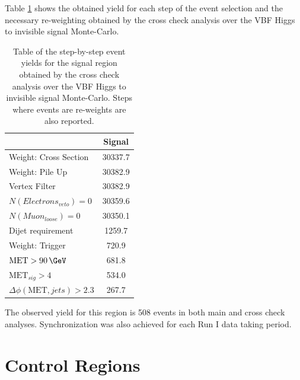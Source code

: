 Table \ref{TABLE:ParkedDataAnalysis_SignalEventSelection_MCCrossSectionYields} shows the obtained yield for each step of the event selection and the necessary re-weighting obtained by the cross check analysis over the \gls{VBF} Higgs to invisible signal Monte-Carlo.

\begin{table}[htp]
\centering

\begin{tabular}{|l|c|}
\hline
 & Signal \\
\hline \hline
Weight: Cross Section                    & 30337.7 \\
Weight: Pile Up                          & 30382.9 \\
Vertex Filter                            & 30382.9 \\
$N(Electrons_{veto})=0$                  & 30359.6 \\
$N(Muon_{loose})=0$                      & 30350.1 \\
Dijet requirement                        &  1259.7 \\ 
Weight: Trigger                          &   720.9 \\ 
$\text{MET}>90\,\GeV$                    &   681.8 \\
$\text{MET}_{sig}>4$                     &   534.0 \\
$\Delta\phi(\text{MET},jets)>2.3$        &   267.7 \\
\hline
\end{tabular}
\caption[Table of the step-by-step event yields for the signal region obtained by the cross check analysis over the VBF Higgs to invisible signal Monte-Carlo.]
{Table of the step-by-step event yields for the signal region obtained by the cross check analysis over the VBF Higgs to invisible signal Monte-Carlo. Steps where events are re-weights are also reported.}
\label{TABLE:ParkedDataAnalysis_SignalEventSelection_MCCrossSectionYields}
\end{table}

The observed yield for this region is 508 events in both main and cross check analyses. Synchronization was also achieved for each Run I data taking period.  

\section{Control Regions}
\label{SECTION:ParkedDataAnalysis_ControlRegions}

